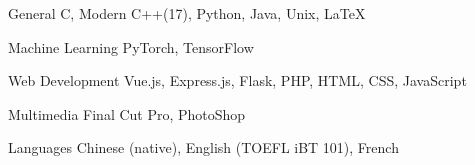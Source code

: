 

\begin{cvskills}

  \cvskill
    {General} %
    {C, Modern C++(17), Python, Java, Unix, LaTeX} %

  \cvskill
    {Machine Learning} %
    {PyTorch, TensorFlow} %

  \cvskill
    {Web Development} %
    {Vue.js, Express.js, Flask, PHP, HTML, CSS, JavaScript} %

  \cvskill
    {Multimedia} %
    {Final Cut Pro, PhotoShop} %

  \cvskill
    {Languages} %
    {Chinese (native), English (TOEFL iBT 101), French} %

\end{cvskills}
